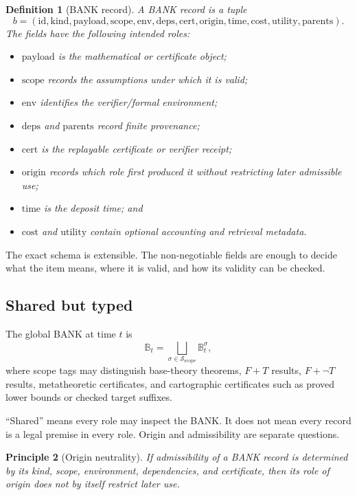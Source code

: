 \documentclass[11pt]{article}
\newtheorem{definition}{Definition}[section]
\newtheorem{principle}[definition]{Principle}
\newcommand{\BANK}{\mathbb{B}}
\begin{document}
\begin{definition}[BANK record]
A BANK record is a tuple
\[
b=
(\mathrm{id},\mathrm{kind},\mathrm{payload},\mathrm{scope},\mathrm{env},
\mathrm{deps},\mathrm{cert},\mathrm{origin},\mathrm{time},\mathrm{cost},
\mathrm{utility},\mathrm{parents}).
\]
The fields have the following intended roles:
\begin{itemize}
\item $\mathrm{payload}$ is the mathematical or certificate object;
\item $\mathrm{scope}$ records the assumptions under which it is valid;
\item $\mathrm{env}$ identifies the verifier/formal environment;
\item $\mathrm{deps}$ and $\mathrm{parents}$ record finite provenance;
\item $\mathrm{cert}$ is the replayable certificate or verifier receipt;
\item $\mathrm{origin}$ records which role first produced it without restricting later admissible use;
\item $\mathrm{time}$ is the deposit time; and
\item $\mathrm{cost}$ and $\mathrm{utility}$ contain optional accounting and retrieval metadata.
\end{itemize}
\end{definition}

The exact schema is extensible. The non-negotiable fields are enough to decide what the item means, where it is valid, and how its validity can be checked.

\subsection{Shared but typed}

The global BANK at time $t$ is
\[
\BANK_t=\bigsqcup_{\sigma\in\mathcal S_{\mathrm{scope}}}\BANK_t^{\sigma},
\]
where scope tags may distinguish base-theory theorems, $F+T$ results, $F+\neg T$ results, metatheoretic certificates, and cartographic certificates such as proved lower bounds or checked target suffixes.

``Shared'' means every role may inspect the BANK. It does not mean every record is a legal premise in every role. Origin and admissibility are separate questions.

\begin{principle}[Origin neutrality]
If admissibility of a BANK record is determined by its kind, scope, environment, dependencies, and certificate, then its role of origin does not by itself restrict later use.
\end{principle}
\end{document}
